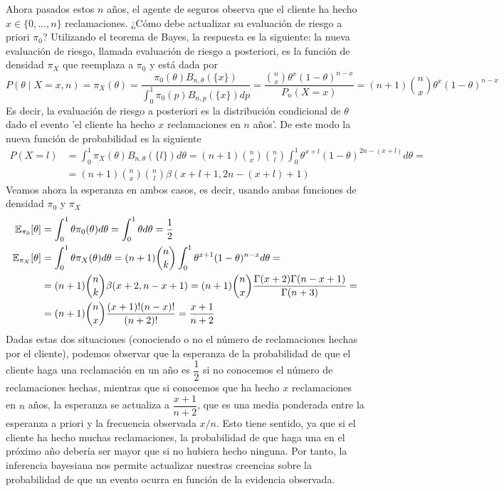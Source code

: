 \begin{ejemplo}
    Ahora pasados estos $n$ años, el agente de seguros observa que el cliente ha hecho $x\in\{0,\ldots,n\}$ reclamaciones. ¿Cómo debe actualizar su evaluación de riesgo a priori $\pi_0$? Utilizando el teorema de Bayes, la respuesta es la siguiente: la nueva evaluación de riesgo, llamada evaluación de riesgo a posteriori, es la función de densidad $\pi_X$ que reemplaza a $\pi_0$ y está dada por
    \begin{equation*}
        P(\theta\mid X=x, n)=\pi_X(\theta) = \dfrac{\pi_0(\theta) B_{n,\theta}(\{x\})}{\int_0^{1} \pi_0(p) B_{n,p}(\{x\}) dp}= \dfrac{\binom{n}{x} \theta^x (1-\theta)^{n-x}}{P_n(X=x)} = (n+1) \binom{n}{x} \theta^x (1-\theta)^{n-x}
    \end{equation*}
    Es decir, la evaluación de riesgo a posteriori es la distribución condicional de $\theta$ dado el evento 'el cliente ha hecho $x$ reclamaciones en $n$ años'. De este modo la nueva función de probabilidad es la siguiente
    \begin{align*}
        P(X=l)&=\int_{0}^{1} \pi_X(\theta) B_{n,\theta}(\{l\}) d\theta = (n+1) \binom{n}{x} \binom{n}{l} \int_{0}^{1} \theta^{x+l} (1-\theta)^{2n - (x+l)} d\theta = \\
        & = (n+1) \binom{n}{x} \binom{n}{l} \beta(x+l+1, 2n - (x+l) + 1) 
    \end{align*}
    Veamos ahora la esperanza en ambos casos, es decir, usando ambas funciones de densidad $\pi_0$ y $\pi_X$
    \begin{align*}
        \mathbb{E}_{\pi_0}[\theta] &= \int_{0}^{1} \theta \pi_0(\theta) d\theta = \int_{0}^{1} \theta d\theta = \dfrac{1}{2} \\
        \mathbb{E}_{\pi_X}[\theta] &= \int_{0}^{1} \theta \pi_X(\theta) d\theta = (n+1) \binom{n}{k} \int_{0}^{1} \theta^{x+1} (1-\theta)^{n-x} d\theta = \\
        &= (n+1) \binom{n}{k} \beta(x+2, n-x+1) = (n+1) \binom{n}{x} \dfrac{\Gamma(x+2)\Gamma(n-x+1)}{\Gamma(n+3)} = \\
        &= (n+1) \binom{n}{x} \dfrac{(x+1)! (n-x)!}{(n+2)!} = \dfrac{x+1}{n+2}
    \end{align*}
    Dadas estas dos situaciones (conociendo o no el número de reclamaciones hechas por el cliente), podemos observar que la esperanza de la probabilidad de que el cliente haga una reclamación en un año es $\dfrac{1}{2}$ si no conocemos el número de reclamaciones hechas, mientras que si conocemos que ha hecho $x$ reclamaciones en $n$ años, la esperanza se actualiza a $\dfrac{x+1}{n+2}$, que es una media ponderada entre la esperanza a priori y la frecuencia observada $x/n$. Esto tiene sentido, ya que si el cliente ha hecho muchas reclamaciones, la probabilidad de que haga una en el próximo año debería ser mayor que si no hubiera hecho ninguna. Por tanto, la inferencia bayesiana nos permite actualizar nuestras creencias sobre la probabilidad de que un evento ocurra en función de la evidencia observada. \\ \\

\end{ejemplo}
